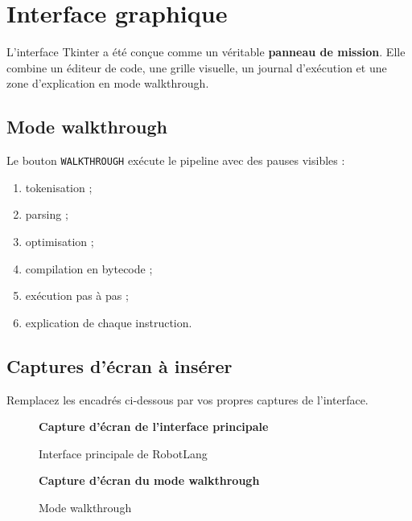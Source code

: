 \documentclass[12pt,a4paper]{article}
\begin{document}
\section{Interface graphique}

\begin{futuristicbox}
L'interface Tkinter a été conçue comme un véritable \textbf{panneau de mission}.
Elle combine un éditeur de code, une grille visuelle, un journal d'exécution et une zone
d'explication en mode walkthrough.
\end{futuristicbox}

\subsection{Mode walkthrough}

Le bouton \texttt{WALKTHROUGH} exécute le pipeline avec des pauses visibles :
\begin{enumerate}[nosep]
  \item tokenisation ;
  \item parsing ;
  \item optimisation ;
  \item compilation en bytecode ;
  \item exécution pas à pas ;
  \item explication de chaque instruction.
\end{enumerate}

\subsection{Captures d'écran à insérer}

Remplacez les encadrés ci-dessous par vos propres captures de l'interface.

\begin{figure}[h!]
  \centering
  \begin{futuristicbox}[width=0.9\textwidth,height=5.2cm]
    \centering \vspace*{1.5cm}
    \textbf{Capture d'écran de l'interface principale}
  \end{futuristicbox}
  \caption{Interface principale de RobotLang}
\end{figure}

\begin{figure}[h!]
  \centering
  \begin{futuristicbox}[width=0.9\textwidth,height=5.2cm]
    \centering \vspace*{1.5cm}
    \textbf{Capture d'écran du mode walkthrough}
  \end{futuristicbox}
  \caption{Mode walkthrough}
\end{figure}
\end{document}
